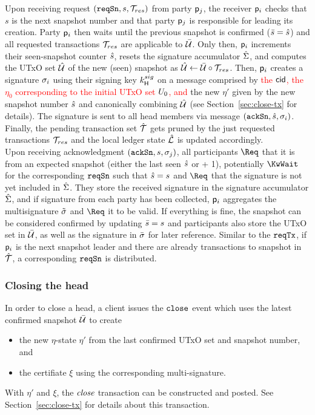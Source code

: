 \quad Upon receiving request $(\mathtt{reqSn},s,{\mathcal T}_{res})$ from
party $\mathsf p_j$, the receiver $\mathsf p_i$ checks that $s$ is the next snapshot
number and that party $\mathsf p_j$ is responsible for leading its
creation. Party $\mathsf p_i$ then waits until the previous
snapshot is confirmed ($\bar s = \hat s$) and all requested transactions
${\mathcal T}_{res}$ are applicable to $\bar {\mathcal U}$. %
Only then, $\mathsf p_i$ increments their seen-snapshot counter $\hat s$, resets the
signature accumulator $\hat{\Sigma}$, and computes the UTxO set $\hat {\mathcal U}$ of the new
(seen) snapshot as $\hat {\mathcal U} \gets \bar {\mathcal U} \circ {\mathcal T}_{res}$. Then, $\mathsf p_i$
creates a signature $\sigma_i$ using their signing key $k^{sig}_\mathsf{H}$ on a
message comprised by \textcolor{red}{the $\mathsf{cid}$, the $\eta_{0}$ corresponding to
	the initial UTxO set $U_{0}$, and} the new $\eta'$ given by the new snapshot
number $\hat s$ and canonically combining $\hat {\mathcal U}$ (see
Section~\ref{sec:close-tx} for details). The signature is sent to all head
members via message $(\mathtt{ackSn},\hat s,\sigma_i)$. Finally, the pending transaction
set $\hat {\mathcal T}$ gets pruned by the just requested transactions ${\mathcal T}_{res}$ and the
local ledger state $\hat {\mathcal L}$ is updated accordingly.\\

\quad Upon receiving acknowledgment $(\mathtt{ackSn},s,\sigma_j)$,
all participants $\Req$ that it is from an expected snapshot (either the last
seen $\hat s$ or + 1), potentially $\KwWait$ for the corresponding $\mathtt{reqSn}$ such
that $\hat s = s$ and $\Req$ that the signature is not yet included in
$\hat{\Sigma}$. They store the received signature in the signature accumulator
$\hat{\Sigma}$, and if signature from each party has been collected, $\mathsf p_i$
aggregates the multisignature $\tilde\sigma$ and $\Req$ it to be valid. If everything
is fine, the snapshot can be considered confirmed by updating $\bar s=s$ and
participants also store the UTxO set in $\bar {\mathcal U}$, as well as the signature in
$\bar{\sigma}$ for later reference. Similar to the $\mathtt{reqTx}$, if $\mathsf p_i$ is the
next snapshot leader and there are already transactions to snapshot in $\hat {\mathcal T}$,
a corresponding $\mathtt{reqSn}$ is distributed.

\subsubsection{Closing the head}

\quad In order to close a head, a client issues the
$\mathtt{close}$ event which uses the latest confirmed snapshot $\bar {\mathcal U}$ to create
\begin{itemize}
	\item the new $\eta$-state $\eta'$ from the last confirmed UTxO set and snapshot
	      number, and
	\item the certifiate $\xi$ using the corresponding multi-signature.
\end{itemize}
With $\eta'$ and $\xi$, the $\textit{close}$ transaction can be constructed and
posted. See Section~\ref{sec:close-tx} for details about this transaction. \\

